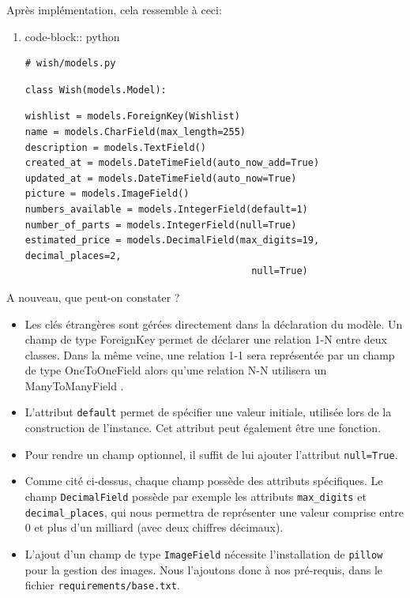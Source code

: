 \documentclass[11pt]{amsbook}
\begin{document}
Après implémentation, cela ressemble à ceci:


\begin{enumerate}

\item{code-block:: python}

\begin{verbatim}
# wish/models.py
\end{verbatim}

\begin{verbatim}
class Wish(models.Model):
\end{verbatim}

\begin{verbatim}
wishlist = models.ForeignKey(Wishlist)
name = models.CharField(max_length=255)
description = models.TextField()
created_at = models.DateTimeField(auto_now_add=True)
updated_at = models.DateTimeField(auto_now=True)
picture = models.ImageField()
numbers_available = models.IntegerField(default=1)
number_of_parts = models.IntegerField(null=True)
estimated_price = models.DecimalField(max_digits=19, decimal_places=2,
                                        null=True)
\end{verbatim}
\end{enumerate}


A nouveau, que peut-on constater ?


\begin{itemize}

\item Les clés étrangères sont gérées directement dans la déclaration du modèle. Un champ de type ForeignKey  permet de déclarer une relation 1-N entre deux classes. Dans la même veine, une relation 1-1 sera représentée par un champ de type OneToOneField  alors qu’une relation N-N utilisera un ManyToManyField .

\item L’attribut \texttt{default} permet de spécifier une valeur initiale, utilisée lors de la construction de l’instance. Cet attribut peut également être une fonction.

\item Pour rendre un champ optionnel, il suffit de lui ajouter l’attribut \texttt{null=True}.

\item Comme cité ci-dessus, chaque champ possède des attributs spécifiques. Le champ \texttt{DecimalField} possède par exemple les attributs \texttt{max\_digits} et \texttt{decimal\_places}, qui nous permettra de représenter une valeur comprise entre 0 et plus d’un milliard (avec deux chiffres décimaux).

\item L’ajout d’un champ de type \texttt{ImageField} nécessite l’installation de \texttt{pillow} pour la gestion des images. Nous l’ajoutons donc à nos pré-requis, dans le fichier \texttt{requirements/base.txt}.

\end{itemize}
\end{document}
